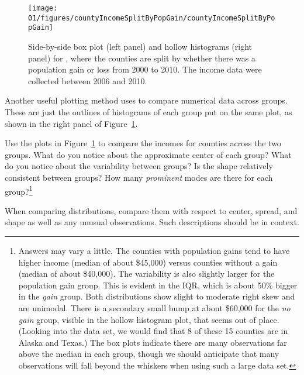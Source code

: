 \begin{figure}
   \centering
   \texttt{[image: 01/figures/countyIncomeSplitByPopGain/countyIncomeSplitByPopGain]}
   \caption{Side-by-side box plot (left panel) and hollow histograms (right panel) for , where the counties are split by whether there was a population gain or loss from 2000 to 2010. The income data were collected between 2006 and 2010.}
   \label{countyIncomeSplitByPopGain}
\end{figure}

Another useful plotting method uses  to compare numerical data across groups. These are just the outlines of histograms of each group put on the same plot, as shown in the right panel of Figure~\ref{countyIncomeSplitByPopGain}.

\begin{exercise} \label{comparingPriceByTypeExercise}
Use the plots in Figure~\ref{countyIncomeSplitByPopGain} to compare the incomes for counties across the two groups. What do you notice about the approximate center of each group? What do you notice about the variability between groups? Is the shape relatively consistent between groups? How many \emph{prominent} modes are there for each group?\footnote{Answers may vary a little. The counties with population gains tend to have higher income (median of about \$45,000) versus counties without a gain (median of about \$40,000). The variability is also slightly larger for the population gain group. This is evident in the IQR, which is about 50\% bigger in the \emph{gain} group. Both distributions show slight to moderate right skew and are unimodal. There is a secondary small bump at about \$60,000 for the \emph{no gain} group, visible in the hollow histogram plot, that seems out of place. (Looking into the data set, we would find that 8 of these 15 counties are in Alaska and Texas.) The box plots indicate there are many observations far above the median in each group, though we should anticipate that many observations will fall beyond the whiskers when using such a large data set.}
\end{exercise}


\begin{tipBox}{
When comparing distributions, compare them with respect to center, spread, and shape as well as any unusual observations.  Such descriptions should be in context.}
\end{tipBox}

